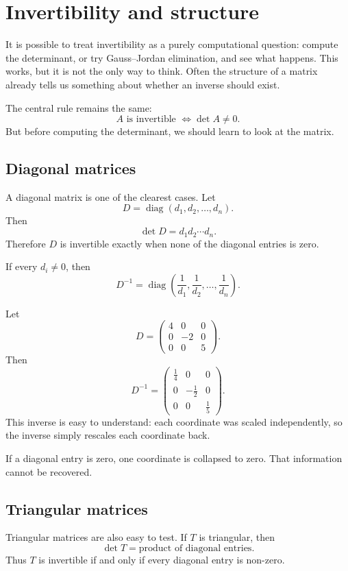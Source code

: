 \section{Invertibility and structure}

It is possible to treat invertibility as a purely computational question: compute the determinant, or try Gauss--Jordan elimination, and see what happens. This works, but it is not the only way to think. Often the structure of a matrix already tells us something about whether an inverse should exist.

The central rule remains the same:
\[
A \text{ is invertible } \iff \det A\ne0.
\]
But before computing the determinant, we should learn to look at the matrix.

\subsection{Diagonal matrices}

A diagonal matrix is one of the clearest cases. Let
\[
D=\operatorname{diag}(d_1,d_2,\ldots,d_n).
\]
Then
\[
\det D=d_1d_2\cdots d_n.
\]
Therefore \(D\) is invertible exactly when none of the diagonal entries is zero.

If every \(d_i\ne0\), then
\[
D^{-1}=\operatorname{diag}\left(\frac1{d_1},\frac1{d_2},\ldots,\frac1{d_n}\right).
\]

\begin{examplebox}
Let
\[
D=\begin{pmatrix}
4&0&0\\
0&-2&0\\
0&0&5
\end{pmatrix}.
\]
Then
\[
D^{-1}=\begin{pmatrix}
\frac14&0&0\\
0&-\frac12&0\\
0&0&\frac15
\end{pmatrix}.
\]
This inverse is easy to understand: each coordinate was scaled independently, so the inverse simply rescales each coordinate back.
\end{examplebox}

If a diagonal entry is zero, one coordinate is collapsed to zero. That information cannot be recovered.

\subsection{Triangular matrices}

Triangular matrices are also easy to test. If \(T\) is triangular, then
\[
\det T=\text{product of diagonal entries}.
\]
Thus \(T\) is invertible if and only if every diagonal entry is non-zero.


